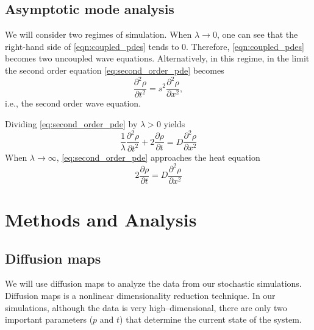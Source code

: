 \documentclass[prl, reprint, final]{revtex4-1}
\begin{document}
\subsection{Asymptotic mode analysis}  \label{subsec:mode_analysis}

We will consider two regimes of simulation.
%
When $\lambda \rightarrow 0$, one can see that the right-hand side of \eqref{eqn:coupled_pdes} tends to 0. 
%
Therefore, \eqref{eqn:coupled_pdes} becomes two uncoupled wave equations.
%
Alternatively, in this regime, in the limit the second order equation \eqref{eq:second_order_pde} becomes 
\[
\frac{\partial^2 \rho}{\partial t^2} = s^2 \frac{\partial ^2 \rho}{\partial x^2},
\]
i.e., the second order wave equation.

Dividing \eqref{eq:second_order_pde} by $\lambda > 0$ yields
\[
\frac{1}{\lambda} \frac{\partial^2 \rho}{\partial t^2} + 2 \frac{\partial \rho}{\partial t} = D \frac{\partial ^2 \rho}{\partial x^2}
\]
When $\lambda \rightarrow \infty$, \eqref{eq:second_order_pde} approaches the heat equation
\[
2 \frac{\partial \rho}{\partial t} = D \frac{\partial ^2 \rho}{\partial x^2}
\]
 
\section{Methods and Analysis}

\subsection{Diffusion maps}

We will use diffusion maps \cite{coifman2005geometric} to analyze the data from our stochastic simulations.
%
Diffusion maps is a nonlinear dimensionality reduction technique.
%
In our simulations, although the data is very high--dimensional, there are only two important parameters ($p$ and $t$) that determine the current state of the system.
\end{document}
